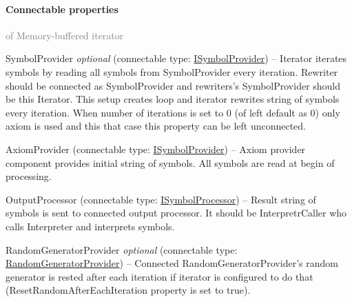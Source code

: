 	\paragraph{Connectable properties}\textcolor{gray}{of Memory-buffered iterator}
	\begin{description*}
		\item[SymbolProvider]
 \textit{optional} 		(connectable type:  \hyperref[Malsys.Processing.Components.ISymbolProvider]{ISymbolProvider})
			-- Iterator iterates symbols by reading all symbols from SymbolProvider every iteration.
            Rewriter should be connected as SymbolProvider and rewriters's SymbolProvider should be this Iterator.
            This setup creates loop and iterator rewrites string of symbols every iteration.
            When number of iterations is set to 0 (of left default as 0) only axiom is used and this that case this property can be left unconnected.
		\item[AxiomProvider]
		(connectable type:  \hyperref[Malsys.Processing.Components.ISymbolProvider]{ISymbolProvider})
			-- Axiom provider component provides initial string of symbols.
            All symbols are read at begin of processing.
		\item[OutputProcessor]
		(connectable type:  \hyperref[Malsys.Processing.Components.ISymbolProcessor]{ISymbolProcessor})
			-- Result string of symbols is sent to connected output processor.
            It should be InterpretrCaller who calls Interpreter and interprets symbols.
		\item[RandomGeneratorProvider]
 \textit{optional} 		(connectable type:  \hyperref[Malsys.Processing.Components.Common.RandomGeneratorProvider]{RandomGeneratorProvider})
			-- Connected RandomGeneratorProvider's random generator is rested after each iteration
            if iterator is configured to do that (ResetRandomAfterEachIteration property is set to true).
	\end{description*}
	


